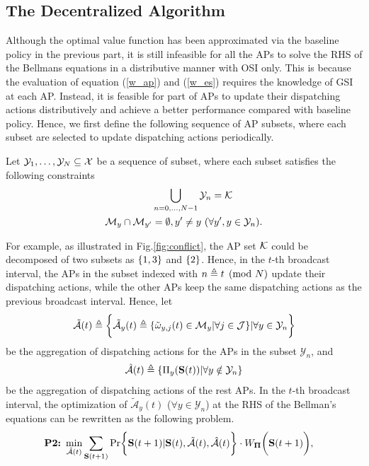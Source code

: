 \subsection{The Decentralized Algorithm}
\label{subsec:ap_alg}
Although the optimal value function has been approximated via the baseline policy in the previous part, it is still infeasible for all the APs to solve the RHS of the Bellmans equations in a distributive manner with OSI only.
This is because the evaluation of equation (\ref{w_ap}) and (\ref{w_es}) requires the knowledge of GSI at each AP.
Instead, it is feasible for part of APs to update their dispatching actions distributively and achieve a better performance compared with baseline policy.
Hence, we first define the following sequence of AP subsets, where each subset are selected to update dispatching actions periodically.
\begin{definition}
    Let $\mathcal{Y}_{1}, \dots, \mathcal{Y}_{N} \subseteq \mathcal{X}$ be a sequence of subset, where each subset satisfies the following constraints
    \begin{align}
        &\bigcup_{n=0,\dots,N-1} \mathcal{Y}_{n} = \mathcal{K}
        \\
        \mathcal{M}_{y} \cap \mathcal{M}_{y'} &=\emptyset, y' \neq y~(\forall y',y \in \mathcal{Y}_{n}).
    \end{align}
\end{definition}
For example, as illustrated in Fig.\ref{fig:conflict}, the AP set $\mathcal{K}$ could be decomposed of two subsets as $\{1,3\}$ and $\{2\}$.
Hence, in the $t$-th broadcast interval, the APs in the subset indexed with $n \triangleq t \pmod{N}$ update their dispatching actions, while the other APs keep the same dispatching actions as the previous broadcast interval.
Hence, let
\begin{align}
    \tilde{\mathcal{A}}(t) \triangleq \bigg\{
        \tilde{\mathcal{A}}_{y}(t) \triangleq \{ \tilde{\omega}_{y,j}(t)\in \mathcal{M}_{y}|\forall j\in\mathcal{J} \} | \forall y\in\mathcal{Y}_{n}
    \bigg\}
\end{align}
be the aggregation of dispatching actions for the APs in the subset $\mathcal{Y}_{n}$, and
\begin{align}
    \hat{\mathcal{A}}(t) \triangleq \{\Pi_{y}(\mathbf{S}(t)) | \forall y\notin\mathcal{Y}_{n}\}
\end{align}
be the aggregation of dispatching actions of the rest APs.
In the $t$-th broadcast interval, the optimization of $\tilde{\mathcal{A}}_{y}(t)$ ($\forall y\in\mathcal{Y}_{n}$) at the RHS of the Bellman's equations can be rewritten as the following problem.
{\small
\begin{align}
    \textbf{P2:}~
    \min_{ \tilde{\mathcal{A}}(t) }
    &\sum_{\Stat(t+1)} \Pr\Brace{
        \Stat(t+1) | \Stat(t), \tilde{\mathcal{A}}(t), \hat{\mathcal{A}}(t)
    } \cdot W_{\Baseline}\Paren{\Stat(t+1)},
\end{align}
}

